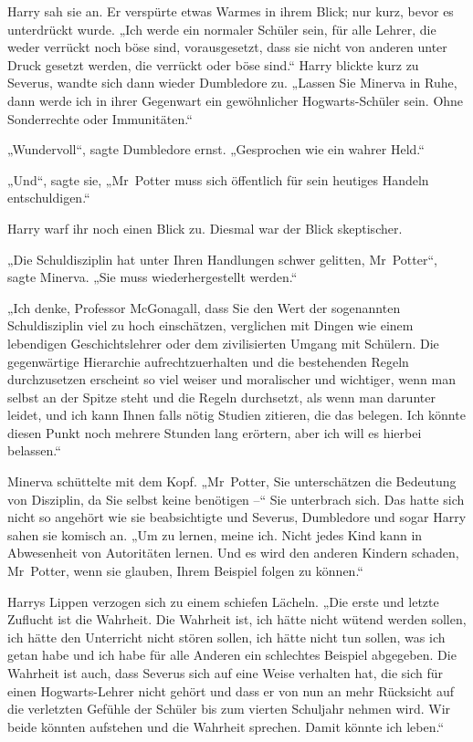 Harry sah sie an. Er verspürte etwas Warmes in ihrem Blick; nur kurz, bevor es unterdrückt wurde. „Ich werde ein normaler Schüler sein, für alle Lehrer, die weder verrückt noch böse sind, vorausgesetzt, dass sie nicht von anderen unter Druck gesetzt werden, die verrückt oder böse sind.“ Harry blickte kurz zu Severus, wandte sich dann wieder Dumbledore zu. „Lassen Sie Minerva in Ruhe, dann werde ich in ihrer Gegenwart ein gewöhnlicher Hogwarts-Schüler sein. Ohne Sonderrechte oder Immunitäten.“ 

„Wundervoll“, sagte Dumbledore ernst. „Gesprochen wie ein wahrer Held.“ 

„Und“, sagte sie, „Mr~Potter muss sich öffentlich für sein heutiges Handeln entschuldigen.“ 

Harry warf ihr noch einen Blick zu. Diesmal war der Blick skeptischer. 

„Die Schuldisziplin hat unter Ihren Handlungen schwer gelitten, Mr~Potter“, sagte Minerva. „Sie muss wiederhergestellt werden.“ 

„Ich denke, Professor McGonagall, dass Sie den Wert der sogenannten Schuldisziplin viel zu hoch einschätzen, verglichen mit Dingen wie einem lebendigen Geschichtslehrer oder dem zivilisierten Umgang mit Schülern. Die gegenwärtige Hierarchie aufrechtzuerhalten und die bestehenden Regeln durchzusetzen erscheint so viel weiser und moralischer und wichtiger, wenn man selbst an der Spitze steht und die Regeln durchsetzt, als wenn man darunter leidet, und ich kann Ihnen falls nötig Studien zitieren, die das belegen. Ich könnte diesen Punkt noch mehrere Stunden lang erörtern, aber ich will es hierbei belassen.“ 

Minerva schüttelte mit dem Kopf. „Mr~Potter, Sie unterschätzen die Bedeutung von Disziplin, da Sie selbst keine benötigen –“ Sie unterbrach sich. Das hatte sich nicht so angehört wie sie beabsichtigte und Severus, Dumbledore und sogar Harry sahen sie komisch an. „Um zu lernen, meine ich. Nicht jedes Kind kann in Abwesenheit von Autoritäten lernen. Und es wird den anderen Kindern schaden, Mr~Potter, wenn sie glauben, Ihrem Beispiel folgen zu können.“ 

Harrys Lippen verzogen sich zu einem schiefen Lächeln. „Die erste und letzte Zuflucht ist die Wahrheit. Die Wahrheit ist, ich hätte nicht wütend werden sollen, ich hätte den Unterricht nicht stören sollen, ich hätte nicht tun sollen, was ich getan habe und ich habe für alle Anderen ein schlechtes Beispiel abgegeben. Die Wahrheit ist auch, dass Severus sich auf eine Weise verhalten hat, die sich für einen Hogwarts-Lehrer nicht gehört und dass er von nun an mehr Rücksicht auf die verletzten Gefühle der Schüler bis zum vierten Schuljahr nehmen wird. Wir beide könnten aufstehen und die Wahrheit sprechen. Damit könnte ich leben.“ 

